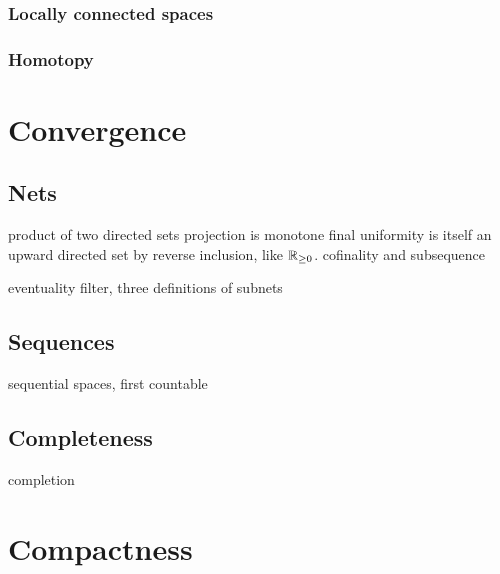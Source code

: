 \documentclass{../crs}
\begin{document}
\subsection{Locally connected spaces}

\subsection{Homotopy}













\chapter{Convergence}

\section{Nets}

product of two directed sets
projection is monotone final
uniformity is itself an upward directed set by reverse inclusion, like $\mathbb{R}_{\ge0}$.
cofinality and subsequence

eventuality filter, three definitions of subnets

\section{Sequences}
sequential spaces, first countable

\section{Completeness}
completion















\chapter{Compactness}
\end{document}
